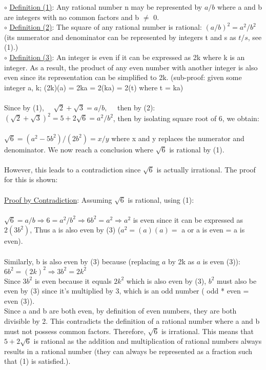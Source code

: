 \documentclass[a4paper, 12pt]{article}
\begin{document}
$\circ$ \underline{Definition (1)}: Any rational number n may be represented by $a/b$ where a and b are integers with no common factors and b $\neq$ 0.\\ 
$\circ$ \underline{Definition (2)}: The square of any rational number is rational: $(a/b)^2 = a^2/b^2$ (its numerator and denominator can be represented by integers t and s as $t/s$, see (1).)\\
$\circ$ \underline{Definition (3)}: An integer is even if it can be expressed as 2k where k is an integer. As a result, the product of any even number with another integer is also even since its representation can be simplified to 2k. (sub-proof: given some integer a, k; (2k)(a) = 2ka = 2(ka) = 2(t) where t = ka)\\
\\\smallskip
Since by (1), $\quad \sqrt 2 + \sqrt 3 = a/b, \quad$ then by (2):\\
$(\sqrt 2 + \sqrt 3)^2 = 5 + 2\sqrt 6 = a^2 / b^2$, \quad then by isolating square root of 6, we obtain:\\\\
$\sqrt 6 = (a^2-5b^2)/(2b^2) = x/y$ where x and y replaces the numerator and denominator. We now reach a conclusion where $\sqrt 6$ is rational by (1).\\
\\
However, this leads to a contradiction since $\sqrt 6$ is actually irrational. The proof for this is shown:\\\\
\underline{Proof by Contradiction}: Assuming $\sqrt 6$ is rational, using (1): \\\\
$\sqrt6 = a/b \Rightarrow 6 = a^2/b^2 \Rightarrow 6b^2 = a^2 \Rightarrow a^2$ is even since it can be expressed as $2(3b^2)$, Thus a is also even by (3) ($a^2 = (a)(a) =$  a or a is even = a is even).
\\\\
Similarly, b is also even by (3) because (replacing $a$ by 2k as $a$ is even (3)):\\
$6b^2 = (2k)^2 \Rightarrow 3b^2 = 2k^2\:$\\
Since $3b^2$ is even because it equals $2k^2$ which is also even by (3), $b^2$ must also be even by (3) since it's multiplied by 3, which is an odd number ( odd * even = even (3)).\\

Since a and b are both even, by definition of even numbers, they are both divisible by 2. This contradicts the definition of a rational number where a and b must not possess common factors. Therefore, $\sqrt6$ is irrational. This means that $5+2\sqrt 6$ is rational as the addition and multiplication of rational numbers always results in a rational number (they can always be represented as a fraction such that (1) is satisfied.).\\
\end{document}

